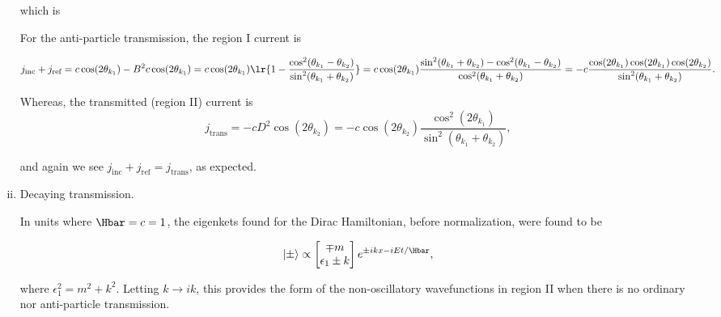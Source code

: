 \begin{enumerate}[(i)]
which is

For the anti-particle transmission, the region I current is

\begin{dmath}\label{eqn:gradQuantumProblemSet4Problem3:1001}
j_{\textrm{inc}} 
+ j_{\textrm{ref}} 
=
c \cos( 2 \theta_{k_1} ) - B^2 c \cos( 2 \theta_{k_1} )
=
c \cos( 2 \theta_{k_1} ) 
\lr{ 1 - 
\frac{ \cos^2(\theta_{k_1} - \theta_{k_2}) }{\sin^2(\theta_{k_1} + \theta_{k_2})} }
=
c \cos( 2 \theta_{k_1} ) 
\frac{ \sin^2(\theta_{k_1} + \theta_{k_2}) - \cos^2(\theta_{k_1} - \theta_{k_2}) }{\cos^2(\theta_{k_1} + \theta_{k_2})} 
=
-c 
\frac{ \cos( 2 \theta_{k_1} ) \cos(2 \theta_{k_1}) \cos(2 \theta_{k_2})}
{\sin^2(\theta_{k_1} + \theta_{k_2})}.
\end{dmath}

Whereas, the transmitted (region II) current is
\begin{dmath}\label{eqn:gradQuantumProblemSet4Problem3:1021}
j_{\textrm{trans}} 
=
 -c D^2 \cos( 2 \theta_{k_2} )
=
 -c \cos( 2 \theta_{k_2} )
\frac{ \cos^2(2 \theta_{k_1}) }{\sin^2(\theta_{k_1} + \theta_{k_2})},
\end{dmath}

and again we see \( j_{\textrm{inc}} + j_{\textrm{ref}} = j_{\textrm{trans}} \), as expected.

\item Decaying transmission.

In units where \( \Hbar = c = 1 \), the eigenkets found for the Dirac Hamiltonian, before normalization, were found to be

\begin{dmath}\label{eqn:gradQuantumProblemSet4Problem3:1041}
\ket{\pm} \propto
\begin{bmatrix}
\mp m \\
\epsilon_1 \pm k
\end{bmatrix}
e^{\pm i k x - i E t/\Hbar},
\end{dmath}

where \( \epsilon_1^2 = m^2 + k^2 \).  Letting \( k \rightarrow i k \), this provides the form of the non-oscillatory wavefunctions in region II when there is no ordinary nor anti-particle transmission.


\end{enumerate}
